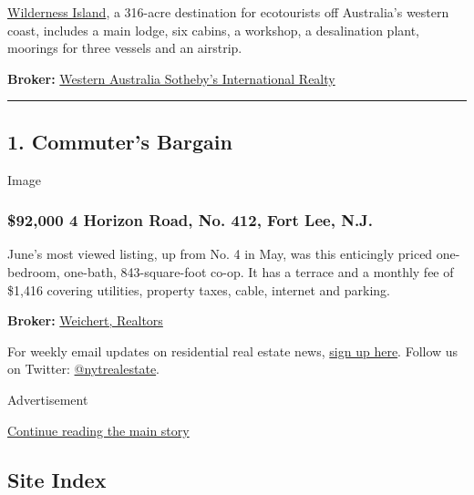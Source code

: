 \href{https://www.wildernessisland.holiday/}{Wilderness Island}, a
316-acre destination for ecotourists off Australia's western coast,
includes a main lodge, six cabins, a workshop, a desalination plant,
moorings for three vessels and an airstrip.

\textbf{Broker:}
\href{https://www.nytimes3xbfgragh.onion/real-estate/aus/wa/other-western-australia/homes-for-sale/wilderness-island/2836-FRK7C4?channel=sale}{Western
Australia Sotheby's International Realty}

\begin{center}\rule{0.5\linewidth}{\linethickness}\end{center}

\hypertarget{1-commuters-bargain}{%
\subsection{1. Commuter's Bargain}\label{1-commuters-bargain}}

Image

\hypertarget{92000--4-horizon-road-no-412-fort-lee-nj}{%
\subsubsection{\$92,000 \textbar{} 4 Horizon Road, No. 412, Fort Lee,
N.J.}\label{92000--4-horizon-road-no-412-fort-lee-nj}}

June's most viewed listing, up from No. 4 in May, was this enticingly
priced one-bedroom, one-bath, 843-square-foot co-op. It has a terrace
and a monthly fee of \$1,416 covering utilities, property taxes, cable,
internet and parking.

\textbf{Broker:}
\href{https://www.nytimes3xbfgragh.onion/real-estate/usa/nj/fort-lee/homes-for-sale/4-horizon-road-unit--412-fort-lee-nj-07024/403-20015060?channel=sale\&locations\%5B\%5D=fort-lee-nj-usa\%2F4-Horizon-Road-address}{Weichert,
Realtors}

For weekly email updates on residential real estate news,
\href{http://www.nytimes3xbfgragh.onion/newsletters/realestate/}{sign up
here}. Follow us on Twitter:
\href{https://twitter.com/nytrealestate}{@nytrealestate}.

Advertisement

\protect\hyperlink{after-bottom}{Continue reading the main story}

\hypertarget{site-index}{%
\subsection{Site Index}\label{site-index}}

